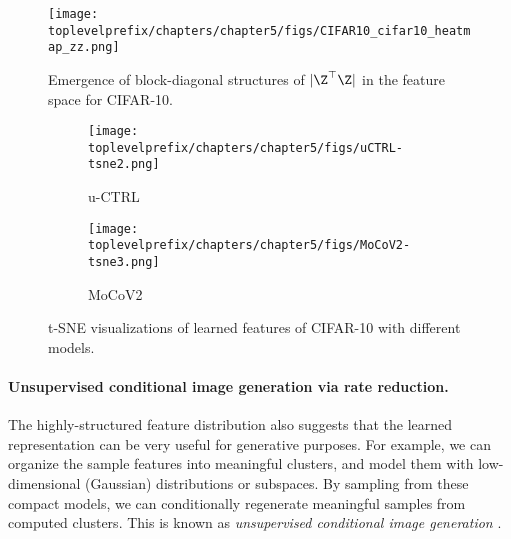 \documentclass[../../book-main.tex]{subfiles}
\begin{document}
\begin{figure}[t]
     \footnotesize
     \centering
    \texttt{[image: \\toplevelprefix/chapters/chapter5/figs/CIFAR10\_cifar10\_heatmap\_zz.png]}
    \caption{\small Emergence of block-diagonal structures of $|\Z^\top \Z|$ in the feature space for CIFAR-10.}
    \label{fig:heatmap_z}
\end{figure}

\begin{figure}[ht!]
    \begin{subfigure}[t]{0.46\textwidth}
        \centering
        \texttt{[image: \\toplevelprefix/chapters/chapter5/figs/uCTRL-tsne2.png]}
        \caption{u-CTRL}
    \end{subfigure}
    \hfill
    \begin{subfigure}[t]{0.46\textwidth}
        \centering
        \texttt{[image: \\toplevelprefix/chapters/chapter5/figs/MoCoV2-tsne3.png]}
        \caption{MoCoV2}
    \end{subfigure}
    \caption{\small t-SNE visualizations of learned features of CIFAR-10 with different models.} 
    \label{fig:tsne}
\end{figure}

\paragraph{Unsupervised conditional image generation via rate reduction.}
The highly-structured feature distribution also suggests that the learned representation can be very useful for generative purposes. For example, we can organize the sample features into meaningful clusters, and model them with low-dimensional (Gaussian) distributions or subspaces. By sampling from these compact models, we can conditionally regenerate meaningful samples from computed clusters. This is known as {\em unsupervised conditional image generation} \cite{hwang2021stein}. 
\end{document}
